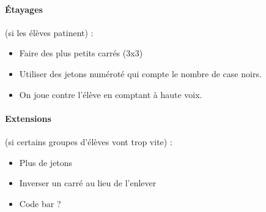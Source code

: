 \documentclass[12pt, a4paper]{article}
\begin{document}
	\paragraph*{Étayages} (si les élèves patinent) :
	\begin{itemize}
		\item Faire des plus petits carrés (3x3)
		\item Utiliser des jetons numéroté qui compte le nombre de case noirs.
		\item On joue contre l'élève
		en comptant à haute voix.
	\end{itemize}
	
	\paragraph*{Extensions} (si certains groupes d'élèves vont trop vite) :
	\begin{itemize}
        \item Plus de jetons
		\item Inverser un carré au lieu de l'enlever
		\item Code bar ?
	\end{itemize}
\end{document}
